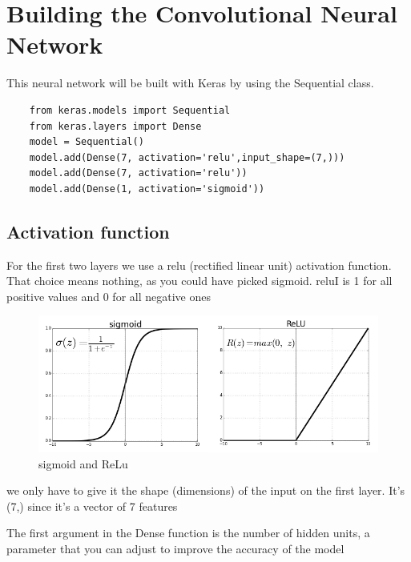 \section{Building the Convolutional Neural Network}
\label{chap:approach}
This neural network will be built with Keras by using the Sequential class.

\begin{lstlisting}
    from keras.models import Sequential
    from keras.layers import Dense
    model = Sequential()
    model.add(Dense(7, activation='relu',input_shape=(7,)))
    model.add(Dense(7, activation='relu'))
    model.add(Dense(1, activation='sigmoid'))   
\end{lstlisting}
\subsection{Activation function}
\label{sec:Activation function}
    For the first two layers we use a relu (rectified linear unit) activation function.
     That choice means nothing, as you could have picked sigmoid.
    reluI is 1 for all positive values and 0 for all negative ones
  
    \begin{figure}[htp]
        \centering
        \includegraphics[width=1.1\textwidth]{images/sigmoid.png }
        \caption{sigmoid and ReLu }
        \label{fig:example4}
    \end{figure}
  
    we only have to give it the shape (dimensions) of the input on the first layer. 
    It’s (7,) since it’s a vector of 7 features
    \newpage

    The first argument in the Dense function is the number of hidden units, 
    a parameter that you can adjust to improve the accuracy of the model

